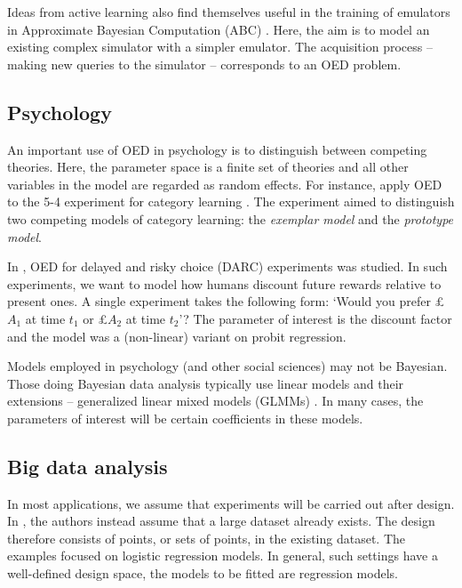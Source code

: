 Ideas from active learning also find themselves useful in the training of emulators in Approximate Bayesian Computation (ABC) \cite{lueckmann2018}. Here, the aim is to model an existing complex simulator with a simpler emulator. The acquisition process -- making new queries to the simulator -- corresponds to an OED problem.

\subsection{Psychology}
An important use of OED in psychology is to distinguish between competing theories. Here, the parameter space is a finite set of theories and all other variables in the model are regarded as random effects. For instance, \cite{ouyang2016} apply OED to the 5-4 experiment for category learning \cite{medin1978}. The experiment aimed to distinguish two competing models of category learning: the \textit{exemplar model} and the \textit{prototype model}.

In \cite{vincent2017}, OED for delayed and risky choice (DARC) experiments was studied. In such experiments, we want to model how humans discount future rewards relative to present ones. A single experiment takes the following form: `Would you prefer £$A_1$ at time $t_1$ or £$A_2$ at time $t_2$'? The parameter of interest is the discount factor and the model was a (non-linear) variant on probit regression.

Models employed in psychology (and other social sciences) may not be Bayesian. Those doing Bayesian data analysis typically use linear models and their extensions -- generalized linear mixed models (GLMMs) \cite{kruschkebda, gelmanbda}. In many cases, the parameters of interest will be certain coefficients in these models.

\subsection{Big data analysis}
In most applications, we assume that experiments will be carried out after design. In \cite{drovandi2017}, the authors instead assume that a large dataset already exists. The design therefore consists of points, or sets of points, in the existing dataset. The examples focused on logistic regression models. In general, such settings have a well-defined design space, the models to be fitted are regression models.

